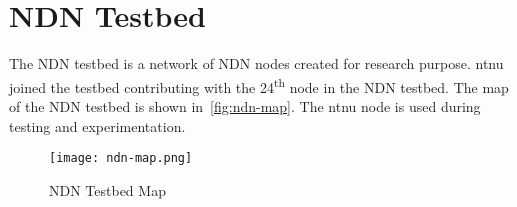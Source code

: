 \section{NDN Testbed}
The \gls{NDN} testbed is a network of \gls{NDN} nodes created for research purpose. 
\gls{ntnu} joined the testbed contributing with the 24\textsuperscript{th} node in the NDN testbed.
The map of the NDN testbed is shown in~\autoref{fig:ndn-map}.
The \gls{ntnu} node is used during testing and experimentation.

\begin{figure}[ht]
  \centering
  \texttt{[image: ndn-map.png]}
  \caption[NDN Testbed map]{NDN Testbed Map}
  \label{fig:ndn-map}
\end{figure}
